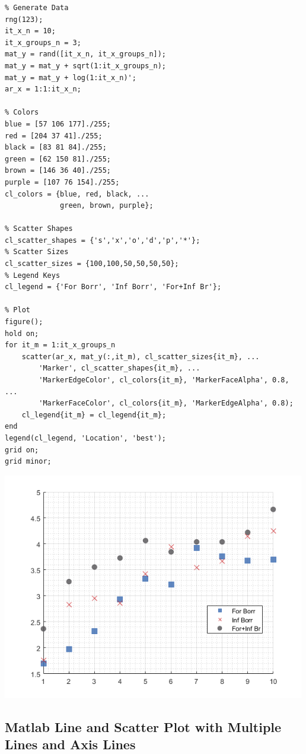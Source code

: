 \documentclass[
]{book}
\begin{document}
\begin{verbatim}
% Generate Data
rng(123);
it_x_n = 10;
it_x_groups_n = 3;
mat_y = rand([it_x_n, it_x_groups_n]);
mat_y = mat_y + sqrt(1:it_x_groups_n);
mat_y = mat_y + log(1:it_x_n)';
ar_x = 1:1:it_x_n;

% Colors
blue = [57 106 177]./255;
red = [204 37 41]./255;
black = [83 81 84]./255;
green = [62 150 81]./255;
brown = [146 36 40]./255;
purple = [107 76 154]./255;
cl_colors = {blue, red, black, ...
             green, brown, purple};

% Scatter Shapes
cl_scatter_shapes = {'s','x','o','d','p','*'};
% Scatter Sizes
cl_scatter_sizes = {100,100,50,50,50,50};
% Legend Keys
cl_legend = {'For Borr', 'Inf Borr', 'For+Inf Br'};

% Plot
figure();
hold on;
for it_m = 1:it_x_groups_n
    scatter(ar_x, mat_y(:,it_m), cl_scatter_sizes{it_m}, ...
        'Marker', cl_scatter_shapes{it_m}, ...
        'MarkerEdgeColor', cl_colors{it_m}, 'MarkerFaceAlpha', 0.8, ...
        'MarkerFaceColor', cl_colors{it_m}, 'MarkerEdgeAlpha', 0.8);
    cl_legend{it_m} = cl_legend{it_m};
end
legend(cl_legend, 'Location', 'best');
grid on; 
grid minor;
\end{verbatim}

\includegraphics[width=5.20833in,height=\textheight]{img/fs_scatter_images/figure_1.png}

\hypertarget{matlab-line-and-scatter-plot-with-multiple-lines-and-axis-lines}{%
\subsection{Matlab Line and Scatter Plot with Multiple Lines and Axis Lines}\label{matlab-line-and-scatter-plot-with-multiple-lines-and-axis-lines}}
\end{document}
